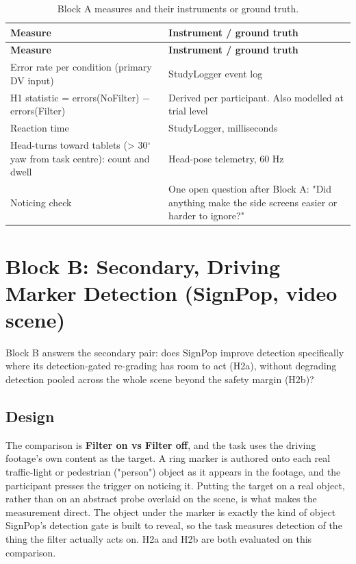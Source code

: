 \begin{longtable}{p{}|p{}}
\caption{Block A measures and their instruments or ground truth.}\\
\hline
\textbf{Measure} & \textbf{Instrument / ground truth} \\
\hline
\endfirsthead
\hline
\textbf{Measure} & \textbf{Instrument / ground truth} \\
\hline
\endhead
\hline
Error rate per condition (primary DV input) & StudyLogger event log \\
H1 statistic = errors(NoFilter) $-$ errors(Filter) & Derived per participant. Also modelled at trial level \\
Reaction time & StudyLogger, milliseconds \\
Head-turns toward tablets (> 30$^{\circ}$ yaw from task centre): count and dwell & Head-pose telemetry, 60 Hz \\
Noticing check & One open question after Block A: "Did anything make the side screens easier or harder to ignore?" \\
\hline
\end{longtable}

\section{Block B: Secondary, Driving Marker Detection (SignPop, video scene)}

Block B answers the secondary pair: does SignPop improve detection specifically where its
detection-gated re-grading has room to act (H2a), without degrading detection pooled across the whole
scene beyond the safety margin (H2b)?

\subsection{Design}

The comparison is \textbf{Filter on vs Filter off}, and the task uses the driving footage's own
content as the target. A ring marker is authored onto each real traffic-light or pedestrian
("person") object as it appears in the footage, and the participant presses the trigger on noticing
it. Putting the target on a real object, rather than on an abstract probe overlaid on the scene, is
what makes the measurement direct. The object under the marker is exactly the kind of object
SignPop's detection gate is built to reveal, so the task measures detection of the thing the filter
actually acts on. H2a and H2b are both evaluated on this comparison.

